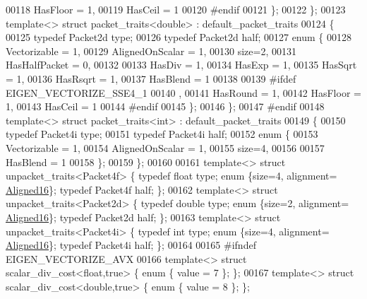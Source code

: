 \begin{DoxyCode}
00118     HasFloor = 1,
00119     HasCeil = 1
00120 \textcolor{preprocessor}{#endif}
00121   \};
00122 \};
00123 \textcolor{keyword}{template}<> \textcolor{keyword}{struct }packet\_traits<double> : default\_packet\_traits
00124 \{
00125   \textcolor{keyword}{typedef} Packet2d type;
00126   \textcolor{keyword}{typedef} Packet2d half;
00127   \textcolor{keyword}{enum} \{
00128     Vectorizable = 1,
00129     AlignedOnScalar = 1,
00130     size=2,
00131     HasHalfPacket = 0,
00132 
00133     HasDiv  = 1,
00134     HasExp  = 1,
00135     HasSqrt = 1,
00136     HasRsqrt = 1,
00137     HasBlend = 1
00138 
00139 \textcolor{preprocessor}{#ifdef EIGEN\_VECTORIZE\_SSE4\_1}
00140     ,
00141     HasRound = 1,
00142     HasFloor = 1,
00143     HasCeil = 1
00144 \textcolor{preprocessor}{#endif}
00145   \};
00146 \};
00147 \textcolor{preprocessor}{#endif}
00148 \textcolor{keyword}{template}<> \textcolor{keyword}{struct }packet\_traits<int>    : default\_packet\_traits
00149 \{
00150   \textcolor{keyword}{typedef} Packet4i type;
00151   \textcolor{keyword}{typedef} Packet4i half;
00152   \textcolor{keyword}{enum} \{
00153     Vectorizable = 1,
00154     AlignedOnScalar = 1,
00155     size=4,
00156 
00157     HasBlend = 1
00158   \};
00159 \};
00160 
00161 \textcolor{keyword}{template}<> \textcolor{keyword}{struct }unpacket\_traits<Packet4f> \{ \textcolor{keyword}{typedef} \textcolor{keywordtype}{float}  type; \textcolor{keyword}{enum} \{size=4, alignment=
      \hyperlink{group__enums_gga45fe06e29902b7a2773de05ba27b47a1af8e2bf74b04c02199f62c5e3c06dbfcc}{Aligned16}\}; \textcolor{keyword}{typedef} Packet4f half; \};
00162 \textcolor{keyword}{template}<> \textcolor{keyword}{struct }unpacket\_traits<Packet2d> \{ \textcolor{keyword}{typedef} \textcolor{keywordtype}{double} type; \textcolor{keyword}{enum} \{size=2, alignment=
      \hyperlink{group__enums_gga45fe06e29902b7a2773de05ba27b47a1af8e2bf74b04c02199f62c5e3c06dbfcc}{Aligned16}\}; \textcolor{keyword}{typedef} Packet2d half; \};
00163 \textcolor{keyword}{template}<> \textcolor{keyword}{struct }unpacket\_traits<Packet4i> \{ \textcolor{keyword}{typedef} \textcolor{keywordtype}{int}    type; \textcolor{keyword}{enum} \{size=4, alignment=
      \hyperlink{group__enums_gga45fe06e29902b7a2773de05ba27b47a1af8e2bf74b04c02199f62c5e3c06dbfcc}{Aligned16}\}; \textcolor{keyword}{typedef} Packet4i half; \};
00164 
00165 \textcolor{preprocessor}{#ifndef EIGEN\_VECTORIZE\_AVX}
00166 \textcolor{keyword}{template}<> \textcolor{keyword}{struct }scalar\_div\_cost<float,true> \{ \textcolor{keyword}{enum} \{ value = 7 \}; \};
00167 \textcolor{keyword}{template}<> \textcolor{keyword}{struct }scalar\_div\_cost<double,true> \{ \textcolor{keyword}{enum} \{ value = 8 \}; \};

\end{DoxyCode}

